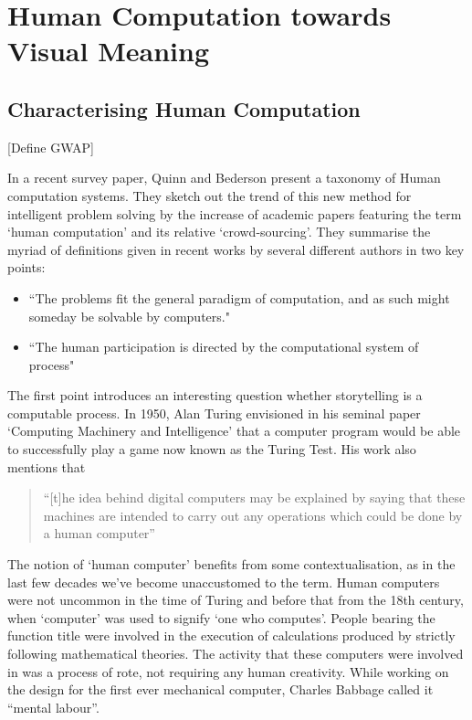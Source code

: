 \chapter{Human Computation towards Visual Meaning}
\label{ch:humancomputation}


\section{Characterising Human Computation}
[Define GWAP]

In a recent survey paper, Quinn and Bederson present a taxonomy of Human computation systems\cite{Quinn:2011us}. They sketch out the trend of this new method for intelligent problem solving by the increase of academic papers featuring the term `human computation' and its relative `crowd-sourcing'. They summarise the myriad of definitions given in recent works by several different authors in two key points:

\begin{itemize}
  \item ``The problems fit  the general paradigm of computation, and as such might someday be solvable by computers."
  \item ``The human participation is directed by the computational system of process"
\end{itemize}

The first point introduces an interesting question whether storytelling is a computable process.
In 1950, Alan Turing envisioned in his seminal paper `Computing Machinery and Intelligence' that a computer program would be able to successfully play a game now known as the Turing Test. His work also mentions that 

\begin{quote}
  ``[t]he idea behind digital computers may be explained by saying that these machines are intended to carry out any operations which could be done by a human computer''\cite{Turing:1950wi}
\end{quote}

The notion of `human computer' benefits from some contextualisation, as in the last few decades we've become unaccustomed to the term. Human computers were not uncommon in the time of Turing and before that from the 18th century, when `computer' was used to signify `one who computes'\cite{grier2007computers}. People bearing the function title were involved in the execution of calculations produced by strictly following mathematical theories. The activity that these computers were involved in was a process of rote, not requiring any human creativity. While working on the design for the first ever mechanical computer, Charles Babbage called it ``mental labour''\cite[Ch.\ 20]{Babbage:1832vu}.


